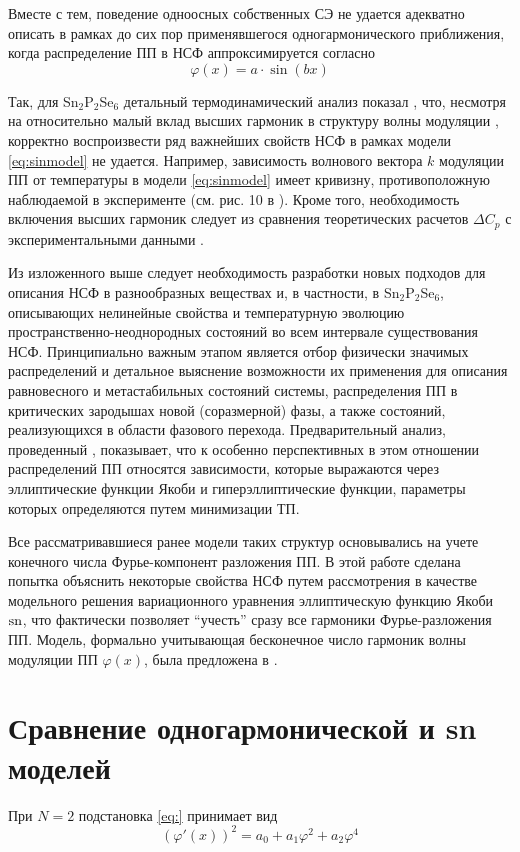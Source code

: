 Вместе с тем, поведение одноосных собственных СЭ не удается адекватно описать в рамках до сих пор применявшегося одногармонического приближения, когда распределение ПП в НСФ аппроксимируется согласно
\begin{equation}
\varphi(x) = a \cdot \sin(bx)
\label{eq:sinmodel}
\end{equation}

Так, для Sn$_2$P$_2$Se$_6$ детальный термодинамический анализ показал \cite{Khoma1998}, что, несмотря на относительно малый вклад высших гармоник в структуру волны модуляции \cite{Barsamian1993}, корректно воспроизвести ряд важнейших свойств НСФ в рамках модели \eqref{eq:sinmodel} не удается. 
Например, зависимость волнового вектора $k$ модуляции ПП от температуры в модели \eqref{eq:sinmodel} имеет кривизну, противоположную наблюдаемой в эксперименте (см. рис. 10 в \cite{Khoma1998}). 
Кроме того, необходимость включения высших гармоник следует из сравнения теоретических расчетов $\Delta C_p$ с экспериментальными данными \cite{Khoma1998}.

Из изложенного выше следует необходимость разработки новых подходов для описания НСФ в разнообразных веществах и, в частности, в Sn$_2$P$_2$Se$_6$, описывающих нелинейные свойства и температурную эволюцию пространственно-неоднородных состояний во всем интервале существования НСФ. 
Принципиально важным этапом является отбор физически значимых распределений и детальное выяснение возможности их применения для описания равновесного и метастабильных состояний системы, распределения ПП в критических зародышах новой (соразмерной) фазы, а также состояний, реализующихся в области фазового перехода. 
Предварительный анализ, проведенный \cite{Barsamian1993}, показывает, что к особенно перспективных в этом отношении распределений ПП относятся зависимости, которые выражаются через эллиптические функции Якоби и гиперэллиптические функции, параметры которых определяются путем минимизации ТП.

Все рассматривавшиеся ранее модели таких структур основывались на учете конечного числа Фурье-компонент разложения ПП. 
В этой работе сделана попытка объяснить некоторые свойства НСФ путем рассмотрения в качестве модельного решения вариационного уравнения эллиптическую функцию Якоби $\operatorname{sn}$, что фактически позволяет ``учесть'' сразу все гармоники Фурье-разложения ПП. 
Модель, формально учитывающая бесконечное число гармоник волны модуляции ПП $\varphi(x)$, была предложена в \cite{Berezovsky1998}.

\section{Сравнение одногармонической и sn моделей}\label{sec:compare}
При $N=2$ подстановка \eqref{eq:} принимает вид
\begin{equation}
\left(\varphi'(x)\right)^2 = a_0 + a_1\varphi^2 + a_2\varphi^4
\end{equation}

